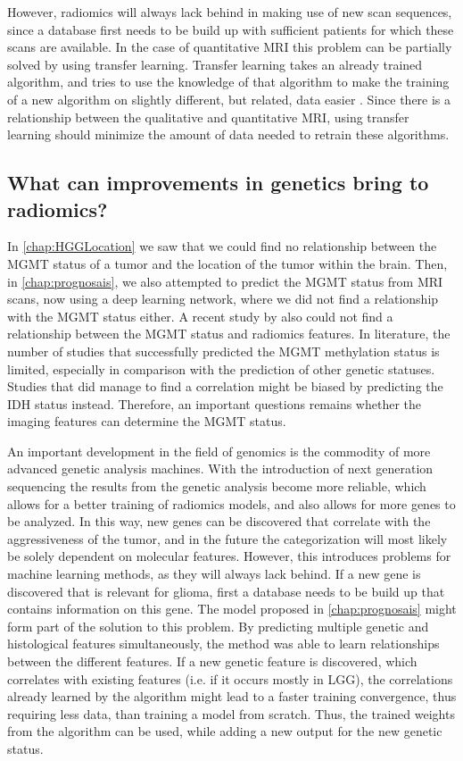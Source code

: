 However, radiomics will always lack behind in making use of new scan sequences, since a database first needs to be build up with sufficient patients for which these scans are available.
In the case of quantitative \gls{MRI} this problem can be partially solved by using transfer learning.
Transfer learning takes an already trained algorithm, and tries to use the knowledge of that algorithm to make the training of a new algorithm on slightly different, but related, data easier \autocite{shin2016transfer}.
Since there is a relationship between the qualitative and quantitative \gls{MRI}, using transfer learning should minimize the amount of data needed to retrain these algorithms.


\subsection{What can improvements in genetics bring to radiomics?}

In \cref{chap:HGGLocation} we saw that we could find no relationship between the \gls{MGMT} status of a tumor and the location of the tumor within the brain.
Then, in \cref{chap:prognosais}, we also attempted to predict the \gls{MGMT} status from \gls{MRI} scans, now using a deep learning network, where we did not find a relationship with the \gls{MGMT} status either.
A recent study by  also could not find a relationship between the \gls{MGMT} status and radiomics features.
In literature, the number of studies that successfully predicted the MGMT methylation status is limited, especially in comparison with the prediction of other genetic statuses.
Studies that did manage to find a correlation might be biased by predicting the IDH status instead.
Therefore, an important questions remains whether the imaging features can determine the MGMT status.

An important development in the field of genomics is the commodity of more advanced genetic analysis machines.
With the introduction of next generation sequencing the results from the genetic analysis become more reliable, which allows for a better training of radiomics models, and also allows for more genes to be analyzed.
In this way, new genes can be discovered that correlate with the aggressiveness of the tumor, and in the future the categorization will most likely be solely dependent on molecular features.
However, this introduces problems for machine learning methods, as they will always lack behind.
If a new gene is discovered that is relevant for glioma, first a database needs to be build up that contains information on this gene.
The model proposed in \cref{chap:prognosais} might form part of the solution to this problem.
By predicting multiple genetic and histological features simultaneously, the method was able to learn relationships between the different features.
If a new genetic feature is discovered, which correlates with existing features (i.e. if it occurs mostly in \gls{LGG}), the correlations already learned by the algorithm might lead to a faster training convergence, thus requiring less data, than training a model from scratch.
Thus, the trained weights from the algorithm can be used, while adding a new output for the new genetic status.

